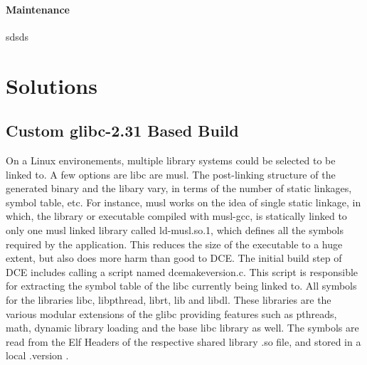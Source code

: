 \documentclass{sig-alternate}
\begin{document}
\paragraph{Maintenance}
sdsds

\section{Solutions}
\label{section:design}

\subsection{Custom glibc-2.31 Based Build}
On a Linux environements, multiple library systems could be selected to be linked to. A few options are libc are musl. The post-linking structure
of the generated binary and the libary vary, in terms of the number of static linkages, symbol table, etc. For instance, musl works on the idea of
single static linkage, in which, the library or executable compiled with musl-gcc, is statically linked to only one musl linked library called 
ld-musl.so.1, which defines all the symbols required by the application. This reduces the size of the executable to a huge extent, but 
also does more harm than good to DCE. The initial build step of DCE includes calling a script named dcemakeversion.c. This script is responsible 
for extracting the symbol table of the libc currently being linked to. All symbols for the libraries libc, libpthread, librt, lib and libdl. These 
libraries are the various modular extensions of the glibc providing features such as pthreads, math, dynamic library loading and the base libc 
library as well. The symbols are read from the Elf Headers of the respective shared library .so file, and stored in a local .version .
\end{document}

